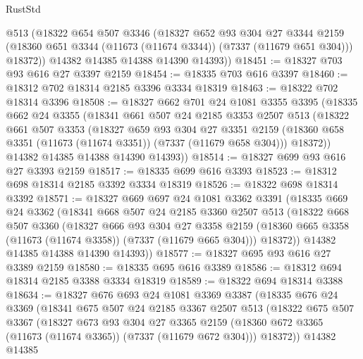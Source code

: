 \begin{lexlean}{RustStd}
\begin{coremodule}
        @513
        (@18322
          @654
          @507
          @3346
          (@18327
            @652
            @93
            @304
            @27
            @3344
            @2159
            (@18360 @651 @3344 (@11673 (@11674 @3344)) (@7337 (@11679 @651 @304)))
            @18372))
        @14382
        @14385
        @14388
        @14390
        @14393))
@18451 := @18327 @703 @93 @616 @27 @3397 @2159
@18454 := @18335 @703 @616 @3397
@18460 := @18312 @702 @18314 @2185 @3396 @3334 @18319
@18463 := @18322 @702 @18314 @3396
@18508 := @18327
    @662
    @701
    @24
    @1081
    @3355
    @3395
    (@18335
      @662
      @24
      @3355
      (@18341
        @661
        @507
        @24
        @2185
        @3353
        @2507
        @513
        (@18322
          @661
          @507
          @3353
          (@18327
            @659
            @93
            @304
            @27
            @3351
            @2159
            (@18360 @658 @3351 (@11673 (@11674 @3351)) (@7337 (@11679 @658 @304)))
            @18372))
        @14382
        @14385
        @14388
        @14390
        @14393))
@18514 := @18327 @699 @93 @616 @27 @3393 @2159
@18517 := @18335 @699 @616 @3393
@18523 := @18312 @698 @18314 @2185 @3392 @3334 @18319
@18526 := @18322 @698 @18314 @3392
@18571 := @18327
    @669
    @697
    @24
    @1081
    @3362
    @3391
    (@18335
      @669
      @24
      @3362
      (@18341
        @668
        @507
        @24
        @2185
        @3360
        @2507
        @513
        (@18322
          @668
          @507
          @3360
          (@18327
            @666
            @93
            @304
            @27
            @3358
            @2159
            (@18360 @665 @3358 (@11673 (@11674 @3358)) (@7337 (@11679 @665 @304)))
            @18372))
        @14382
        @14385
        @14388
        @14390
        @14393))
@18577 := @18327 @695 @93 @616 @27 @3389 @2159
@18580 := @18335 @695 @616 @3389
@18586 := @18312 @694 @18314 @2185 @3388 @3334 @18319
@18589 := @18322 @694 @18314 @3388
@18634 := @18327
    @676
    @693
    @24
    @1081
    @3369
    @3387
    (@18335
      @676
      @24
      @3369
      (@18341
        @675
        @507
        @24
        @2185
        @3367
        @2507
        @513
        (@18322
          @675
          @507
          @3367
          (@18327
            @673
            @93
            @304
            @27
            @3365
            @2159
            (@18360 @672 @3365 (@11673 (@11674 @3365)) (@7337 (@11679 @672 @304)))
            @18372))
        @14382
        @14385

\end{coremodule}
\end{lexlean}
